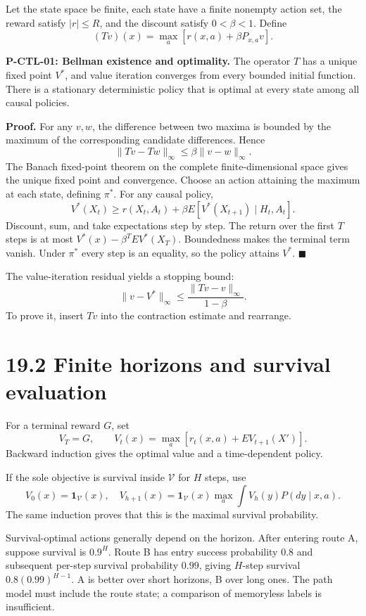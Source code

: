 \documentclass[
  english,
  11pt,
  oneside]{book}
\newcounter{none} %
\begin{document}
Let the state space be finite, each state have a finite nonempty action set, the reward satisfy \(|r|\le R\), and the discount satisfy \(0<\beta<1\). Define \[(Tv)(x)=\max_a[r(x,a)+\beta P_{x,a}v].\]

\hypertarget{p-ctl-01}{}\label{p-ctl-01}

\textbf{P-CTL-01: Bellman existence and optimality.} The operator \(T\) has a unique fixed point \(V^*\), and value iteration converges from every bounded initial function. There is a stationary deterministic policy that is optimal at every state among all causal policies.

\textbf{Proof.} For any \(v,w\), the difference between two maxima is bounded by the maximum of the corresponding candidate differences. Hence \[\|Tv-Tw\|_\infty\le\beta\|v-w\|_\infty.\] The Banach fixed-point theorem on the complete finite-dimensional space gives the unique fixed point and convergence. Choose an action attaining the maximum at each state, defining \(\pi^*\). For any causal policy, \[V^*(X_t)\ge r(X_t,A_t)+\beta E[V^*(X_{t+1})\mid H_t,A_t].\] Discount, sum, and take expectations step by step. The return over the first \(T\) steps is at most \(V^*(x)-\beta^TEV^*(X_T)\). Boundedness makes the terminal term vanish. Under \(\pi^*\) every step is an equality, so the policy attains \(V^*\). \(\blacksquare\)

The value-iteration residual yields a stopping bound: \[\|v-V^*\|_\infty\le\frac{\|Tv-v\|_\infty}{1-\beta}.\] To prove it, insert \(Tv\) into the contraction estimate and rearrange.

\section{19.2 Finite horizons and survival evaluation}\label{finite-horizons-and-survival-evaluation}

For a terminal reward \(G\), set \[V_T=G,\qquad
V_t(x)=\max_a[r_t(x,a)+E V_{t+1}(X')].\] Backward induction gives the optimal value and a time-dependent policy.

If the sole objective is survival inside \(\mathcal V\) for \(H\) steps, use \[V_0(x)=\mathbf1_{\mathcal V}(x),\quad
V_{h+1}(x)=\mathbf1_{\mathcal V}(x)\max_a\int V_h(y)P(dy\mid x,a).\] The same induction proves that this is the maximal survival probability.

Survival-optimal actions generally depend on the horizon. After entering route A, suppose survival is \(0.9^H\). Route B has entry success probability \(0.8\) and subsequent per-step survival probability \(0.99\), giving \(H\)-step survival \(0.8(0.99)^{H-1}\). A is better over short horizons, B over long ones. The path model must include the route state; a comparison of memoryless labels is insufficient.
\end{document}
